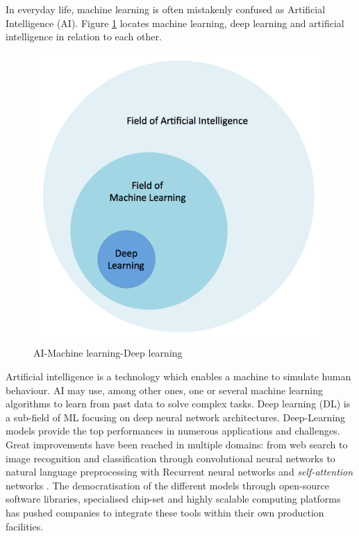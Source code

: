 In everyday life, machine learning is often mistakenly confused as Artificial Intelligence (AI). Figure \ref{fig:ai_ml_dl} locates  machine learning, deep learning and artificial intelligence in relation to each other.
%
\begin{figure}
\centerline{\includegraphics[scale=0.8]{images/chapter_2/AI_ML_DL.png}}
\caption{AI-Machine learning-Deep learning}
\label{fig:ai_ml_dl}
\end{figure}
%
Artificial intelligence is a technology which enables a machine to simulate human behaviour. AI may use, among other ones, one or several machine learning algorithms to learn from past data to solve complex tasks. Deep learning (DL) is a sub-field of ML focusing on deep neural network architectures. Deep-Learning models provide the top performances in numerous applications and challenges. Great improvements have been reached in multiple domains: from web search to image recognition and classification through convolutional neural networks to natural language preprocessing with Recurrent neural networks and \textit{self-attention} networks \citep{vaswani2017attention}. The democratisation of the different models through open-source software libraries, specialised chip-set and highly scalable computing platforms has pushed companies to integrate these tools within their own production facilities. 

